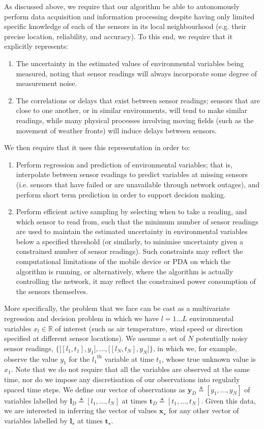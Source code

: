 \documentclass{acmtrans2m}
\newcommand{\vect}[1]{\boldsymbol{#1}}
\newcommand{\vx}{\vect{x}}
\newcommand{\vxst}{\vx_\star}
\newcommand{\vtst}{\vect{t}_\star}
\newcommand{\vtD}{\vect{t}_D}
\newcommand{\vyD}{\vect{y}_D}
\newcommand{\vlst}{\vect{l}_\star}
\newcommand{\vlD}{\vect{l}_D}
\newcommand{\defequal}{\triangleq}
\begin{document}
\noindent As discussed above, we require that our algorithm be able to autonomously perform data acquisition and information processing despite having only limited specific knowledge of each of the sensors in its local neighbourhood (e.g. their precise location, reliability, and accuracy). To this end, we require that it explicitly represents:
\begin{enumerate}
\item The uncertainty in the estimated values of environmental variables being measured, noting that sensor readings will always incorporate some degree of measurement noise.
\item The correlations or delays that exist between sensor readings; sensors that are close to one another, or in similar environments, will tend to make similar readings, while many physical processes involving moving fields (such as the movement of weather fronts) will induce delays between sensors.
\end{enumerate}
We then require that it uses this representation in order to:
\begin{enumerate}
\item Perform regression and prediction of environmental variables; that is, interpolate between sensor readings to predict variables at missing sensors (i.e. sensors that have failed or are unavailable through network outages), and perform short term prediction in order to support decision making.
\item Perform efficient active sampling by selecting when to take a reading, and which sensor to read from, such that the minimum number of sensor readings are used to maintain the estimated uncertainty in environmental variables below a specified threshold (or similarly, to minimise uncertainty given a constrained number of sensor readings). Such constraints may reflect the computational limitations of the mobile device or PDA on which the algorithm is running, or alternatively, where the algorithm is actually controlling the network, it may reflect the constrained power consumption of the sensors themselves.
\end{enumerate}
More specifically, the problem that we face can be cast as a multivariate regression and decision problem in which we have $l=1\ldots L$ environmental variables $x_l \in \mathbb{R}$ of interest (such as air temperature, wind speed or direction specified at different sensor locations). We assume a set of $N$ potentially noisy sensor readings, $ \bigl\{\bigl[[l_1,t_1],y_1\bigr],\ldots,\bigl[[l_N,t_N],y_N\bigr]\bigr\}$, in which we, for example, observe the value $y_1$ for the ${l_1}^\text{th}$ variable at time $t_1$, whose true unknown value is $x_1$. Note that we do not require that all the variables are observed at the same time, nor do we impose any discretisation of our observations into regularly spaced time steps. We define our vector of observations as $\vyD\defequal[y_1,\ldots,y_N]$ of variables labelled by $\vlD\defequal[l_1,\ldots,l_N]$ at times $\vtD\defequal[t_1,\ldots,t_N]$. Given this data, we are interested in inferring the vector of values $\vxst$ for any other vector of variables labelled by $\vlst$ at times $\vtst$.
\end{document}
